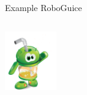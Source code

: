 \documentclass[aspectratio=169]{beamer}
\begin{document}
    \begin{frame}{Example RoboGuice}
      \begin{columns}[t]
        \begin{column}{0.2\textwidth}
          \begin{center}
            \includegraphics[height=1.0in]{roboguice.png}
          \end{center}
        \end{column}

       \begin{column}{0.8\textwidth}
Compare yourself:

\verb|class AndroidShowCase extends Activity
%   private TextView name; 
%   public void onCreate(Bundle savedInstanceState) { 
%     super.onCreate(savedInstanceState); 
%     setContentView(R.layout.androidshowcase); 
%     name = findViewById(R.id.name);
%|

%  



        \end{column}
      \end{columns}
    \end{frame}
  
\end{document}
